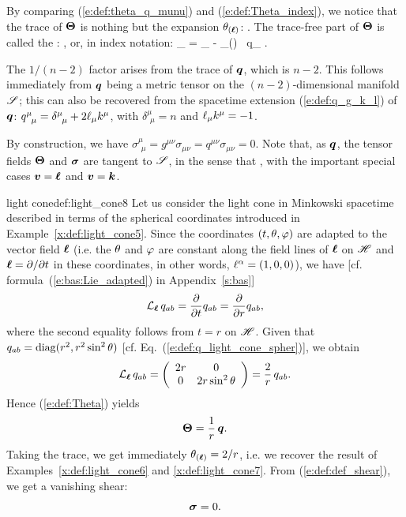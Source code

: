 By comparing (\ref{e:def:theta_q_munu}) and (\ref{e:def:Theta_index}), we
notice that the trace of $\bm{\Theta}$ is nothing but the expansion
$\theta_{(\bm{\ell})}$:
\be
   .
\ee
The trace-free part of $\bm{\Theta}$ is called the
:
\be \label{e:def:def_shear}
     ,
\ee
or, in index notation:
\be
    \sigma_{\alpha\beta} = \Theta_{\alpha\beta} -  \theta_{(\wl)} \, q_{\alpha\beta} .
\ee
\begin{remark}
The $1/(n-2)$ factor arises from the trace of $\bm{q}$, which is $n-2$.
This follows immediately from $\bm{q}$ being a metric tensor on the
$(n-2)$-dimensional manifold $\mathscr{S}$; this can also be recovered from the
spacetime extension (\ref{e:def:q_g_k_l}) of $\bm{q}$:
$q^\mu_{\ \, \mu} = \delta^\mu_{\ \, \mu} + 2 \el_\mu k^\mu$,
with $\delta^\mu_{\ \, \mu} = n$ and $\ell_\mu k^\mu=-1$.
\end{remark}
By construction, we have
$\sigma^\mu_{\ \, \mu} = g^{\mu\nu} \sigma_{\mu\nu} = q^{\mu\nu} \sigma_{\mu\nu} = 0$.
Note that, as $\bm{q}$, the tensor fields
$\bm{\Theta}$ and $\bm{\sigma}$ are tangent to $\mathscr{S}$, in the sense
that
\be \label{e:def:Theta_sigma_tangent}
   ,
\ee
with the important special cases $\bm{v} = \bm{\ell}$ and $\bm{v} = \bm{k}$.

\begin{texample}{light cone}{def:light_cone8}
Let us consider the light cone in Minkowski spacetime described in terms of the
spherical coordinates introduced in Example~\ref{x:def:light_cone5}.
Since the coordinates $(t,\theta,\varphi)$
are adapted to the vector field $\bm{\ell}$ (i.e. the $\theta$ and $\varphi$ are constant
along the field lines of $\bm{\ell}$ on $\mathscr{H}$ and $\bm{\ell} = \partial/\partial t$ in these
coordinates, in other words, $\ell^\alpha=(1,0,0)$), we have [cf. formula~(\ref{e:bas:Lie_adapted})
in Appendix~\ref{s:bas}]
\[
    {\mathcal{L}}_{\bm{\ell}}\, q_{ab} = \frac{\partial }{\partial t} q_{ab} = \frac{\partial }{\partial r} q_{ab} ,
\]
where the second equality follows from $t=r$ on $\mathscr{H}$. Given that
$q_{ab} = \mathrm{diag}(r^2, r^2\sin^2\theta)$
[cf. Eq.~(\ref{e:def:q_light_cone_spher})], we obtain
\[
    {\mathcal{L}}_{\bm{\ell}}\, q_{ab} = \left( \begin{array}{cc}
        2 r & 0  \\
        0 & 2 r \sin^2\theta
        \end{array} \right)
        = \frac{2}{r} \, q_{ab} .
\]
Hence (\ref{e:def:Theta}) yields
\[
    \bm{\Theta} = \frac{1}{r} \, \bm{q} .
\]
Taking the trace, we get immediately $\theta_{(\bm{\ell})} = 2/r$, i.e. we recover
the result of Examples~\ref{x:def:light_cone6} and \ref{x:def:light_cone7}.
From (\ref{e:def:def_shear}), we get a vanishing shear:
\[
    \bm{\sigma} = 0 .
\]
\end{texample}

